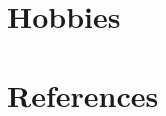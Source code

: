 \documentclass[letterpaper,
		10pt]{article}
\let\oldhref\href
\renewcommand{\href}[3][blue]{\oldhref{#2}{\color{#1}{#3}}}
\newcommand{\entry}[4]{
\ifthenelse{\isempty{#3}}
{\slimentry{#1}{#2}}{

\begin{minipage}[t]{.15\linewidth}
\hfill \textsc{#1}
\end{minipage}
\hfill\vline\hfill
\begin{minipage}[t]{.80\linewidth}
{\bf#2}\\\textit{#3} \footnotesize{#4}
\end{minipage}\\
\vspace{.2cm}
}}
\newcommand{\slimentry}[2]{
\begin{minipage}[t]{.15\linewidth}
\hfill \textsc{#1}
\end{minipage}
\hfill\vline\hfill
\begin{minipage}[t]{.80\linewidth}
#2
\end{minipage}\\
\vspace{.25cm}
}
\begin{document}




\section{Hobbies}


\section{References}


\end{document}
